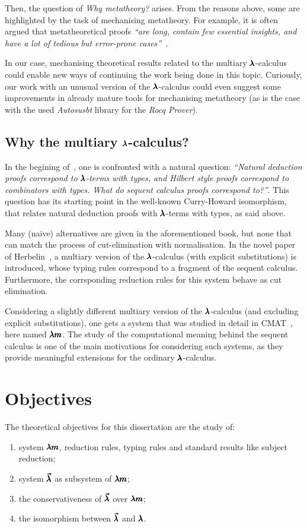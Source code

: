 Then, the question of \textit{Why metatheory?} arises.
From the reasons above, some are highlighted by the task of mechanising metatheory.
For example, it is often argued that metatheoretical proofs \textit{``are long, contain few essential insights, and have a lot of tedious but error-prone cases''}~\cite{AutosubstSchafer}.

In our case, mechanising theoretical results related to the multiary $\pmb{\lambda}$-calculus could enable new ways of continuing the work being done in this topic.
Curiously, our work with an unusual version of the $\pmb{\lambda}$-calculus could even suggest some improvements in already mature tools for mechanising metatheory (as is the case with the used \textit{Autosusbt} library for the \textit{Rocq Prover}).

\subsection{Why the multiary $\pmb{\lambda}$-calculus?}
In the begining of~\cite[Chapter~7.3]{CurryHoward}, one is confronted with a natural question: \textit{``Natural deduction proofs correspond to $\pmb{\lambda}$-terms with types, and Hilbert style proofs correspond to combinators with types. What do sequent calculus proofs correspond to?''}.
This question has its starting point in the well-known Curry-Howard isomorphism, that relates natural deduction proofs with $\pmb{\lambda}$-terms with types, as said above.

Many (naive) alternatives are given in the aforementioned book, but none that can match the process of cut-elimination with normalisation.
In the novel paper of Herbelin~\cite{Herbelin1994}, a multiary version of the $\pmb{\lambda}$-calculus (with explicit substitutions) is introduced, whose typing rules correspond to a fragment of the sequent calculus.
Furthermore, the corrsponding reduction rules for this system behave as cut elimination.

Considering a slightly different multiary version of the $\pmb{\lambda}$-calculus (and excluding explicit substitutions), one gets a system that was studied in detail in CMAT~\cite{JCES2002, JCESLuis}, here named $\pmb{\lambda m}$.
The study of the computational meaning behind the sequent calculus is one of the main motivations for considering such systems, as they provide meaningful extensions for the ordinary $\pmb{\lambda}$-calculus.

\section{Objectives}
The theoretical objectives for this dissertation are the study of:
\begin{enumerate}
\item system $\pmb{\lambda m}$, reduction rules, typing rules and standard results like subject reduction;
\item system $\pmb{\vec \lambda}$ as subsystem of $\pmb{\lambda m}$;
\item the conservativeness of $\pmb{\vec \lambda}$ over $\pmb{\lambda m}$;
\item the isomorphism between $\pmb{\vec \lambda}$ and $\pmb{\lambda}$.
\end{enumerate}

